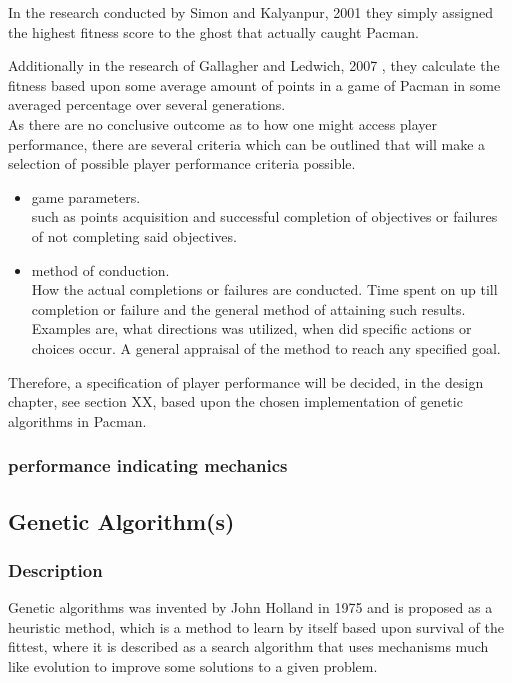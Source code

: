 In the research conducted by Simon and Kalyanpur, 2001 \cite{Kalyanpur2001} they simply assigned the highest fitness score to the ghost that actually caught Pacman.

Additionally in the research of Gallagher and Ledwich, 2007 \cite{Gallagher2007}, they calculate the fitness based upon some average amount of points in a game of Pacman in some averaged percentage over several generations.\\

As there are no conclusive outcome as to how one might access player performance, there are several criteria which can be outlined that will make a selection of possible player performance criteria possible.

\begin{itemize}
\item game parameters.\\
such as points acquisition and successful completion of objectives or failures of not completing said objectives.
\item method of conduction.\\
How the actual completions or failures are conducted. Time spent on up till completion or failure and the general method of attaining such results. Examples are, what directions was utilized, when did specific actions or choices occur. A general appraisal of the method to reach any specified goal.
\end{itemize}

Therefore, a specification of player performance will be decided, in the design chapter, see section XX, based upon the chosen implementation of genetic algorithms in Pacman.

\subsubsection{performance indicating mechanics}



\subsection{Genetic Algorithm(s)}

\subsubsection{Description}
Genetic algorithms was invented by John Holland in 1975 and is proposed as a heuristic method, which is a method to learn by itself based upon survival of the fittest, where it is described as a  search algorithm that uses mechanisms much like evolution to improve some solutions to a given problem. \cite[pp. 20]{Sivanandam2008}

